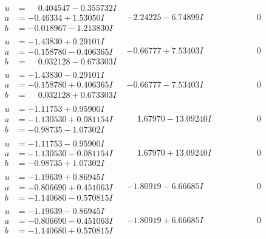 \documentclass[1p]{elsarticle_modified}
\theoremstyle{definition}
\begin{document}
$$\begin{array}{c|c|c}
\begin{aligned}
u &= \phantom{-}0.404547 - 0.355732 I \\
a &= -0.46334 + 1.53050 I \\
b &= -0.018967 - 1.213830 I\end{aligned}
 & -2.24225 - 6.74899 I & \phantom{-0.000000 } 0 \\ \hline\begin{aligned}
u &= -1.43830 + 0.29101 I \\
a &= -0.158780 - 0.406365 I \\
b &= \phantom{-}0.032128 - 0.673303 I\end{aligned}
 & -0.66777 + 7.53403 I & \phantom{-0.000000 } 0 \\ \hline\begin{aligned}
u &= -1.43830 - 0.29101 I \\
a &= -0.158780 + 0.406365 I \\
b &= \phantom{-}0.032128 + 0.673303 I\end{aligned}
 & -0.66777 - 7.53403 I & \phantom{-0.000000 } 0 \\ \hline\begin{aligned}
u &= -1.11753 + 0.95900 I \\
a &= -1.130530 + 0.081154 I \\
b &= -0.98735 - 1.07302 I\end{aligned}
 & \phantom{-}1.67970 - 13.09240 I & \phantom{-0.000000 } 0 \\ \hline\begin{aligned}
u &= -1.11753 - 0.95900 I \\
a &= -1.130530 - 0.081154 I \\
b &= -0.98735 + 1.07302 I\end{aligned}
 & \phantom{-}1.67970 + 13.09240 I & \phantom{-0.000000 } 0 \\ \hline\begin{aligned}
u &= -1.19639 + 0.86945 I \\
a &= -0.806690 + 0.451063 I \\
b &= -1.140680 - 0.570815 I\end{aligned}
 & -1.80919 - 6.66685 I & \phantom{-0.000000 } 0 \\ \hline\begin{aligned}
u &= -1.19639 - 0.86945 I \\
a &= -0.806690 - 0.451063 I \\
b &= -1.140680 + 0.570815 I\end{aligned}
 & -1.80919 + 6.66685 I & \phantom{-0.000000 } 0 \\ \hline\begin{aligned}

\end{aligned}
\end{array}$$
\end{document}
